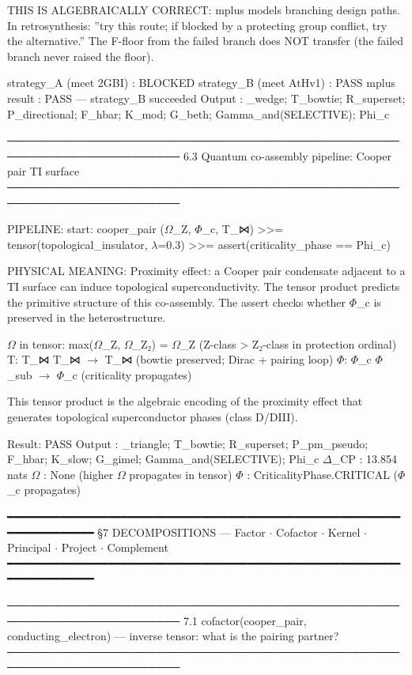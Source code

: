\documentclass[12pt,a4paper]{article}
\begin{document}
THIS IS ALGEBRAICALLY CORRECT:
mplus models branching design paths. In retrosynthesis: ''try this
route; if blocked by a protecting group conflict, try the alternative.''
The F-floor from the failed branch does NOT transfer (the failed
branch never raised the floor).

strategy\_A (meet 2GBI)    : BLOCKED
strategy\_B (meet AtHv1)   : PASS
mplus result              : PASS --- strategy\_B succeeded
Output : \langleD\_wedge; T\_bowtie; R\_superset; P\_directional; F\_hbar; K\_mod; G\_beth; Gamma\_and(SELECTIVE); Phi\_c\rangle

────────────────────────────────────────────────────────────────────────
6.3  Quantum co-assembly pipeline: Cooper pair \otimes TI surface
────────────────────────────────────────────────────────────────────────

PIPELINE:
start: cooper\_pair  ($\Omega$\_Z, $\Phi$\_c, T\_⋈)
\textgreater{}\textgreater{}= tensor(topological\_insulator, $\lambda$=0.3)
\textgreater{}\textgreater{}= assert(criticality\_phase == Phi\_c)

PHYSICAL MEANING:
Proximity effect: a Cooper pair condensate adjacent to a TI surface
can induce topological superconductivity. The tensor product predicts
the primitive structure of this co-assembly. The assert checks whether
$\Phi$\_c is preserved in the heterostructure.

$\Omega$ in tensor: max($\Omega$\_Z, $\Omega$\_Z₂) = $\Omega$\_Z (Z-class \textgreater{} Z₂-class in protection ordinal)
T: T\_⋈ \otimes T\_⋈ $\rightarrow$ T\_⋈ (bowtie preserved; Dirac + pairing loop)
$\Phi$: $\Phi$\_c \otimes $\Phi$\_sub $\rightarrow$ $\Phi$\_c (criticality propagates)

This tensor product is the algebraic encoding of the proximity effect
that generates topological superconductor phases (class D/DIII).

Result: PASS
Output : \langleD\_triangle; T\_bowtie; R\_superset; P\_pm\_pseudo; F\_hbar; K\_slow; G\_gimel; Gamma\_and(SELECTIVE); Phi\_c\rangle
$\Delta$\xi\_CP  : 13.854 nats
$\Omega$      : None  (higher $\Omega$ propagates in tensor)
$\Phi$      : CriticalityPhase.CRITICAL  ($\Phi$\_c propagates)

━━━━━━━━━━━━━━━━━━━━━━━━━━━━━━━━━━━━━━━━━━━━━━━━━━━━━━━━━━━━━━━━━━━━━━━━
§7  DECOMPOSITIONS  ---  Factor $\cdot$ Cofactor $\cdot$ Kernel $\cdot$ Principal $\cdot$ Project $\cdot$ Complement
━━━━━━━━━━━━━━━━━━━━━━━━━━━━━━━━━━━━━━━━━━━━━━━━━━━━━━━━━━━━━━━━━━━━━━━━

────────────────────────────────────────────────────────────────────────
7.1  cofactor(cooper\_pair, conducting\_electron) --- inverse tensor: what is the pairing partner?
────────────────────────────────────────────────────────────────────────
\end{document}
